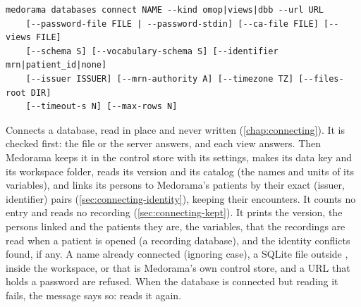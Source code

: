 \begin{lstlisting}[style=signature]
medorama databases connect NAME --kind omop|views|dbb --url URL
    [--password-file FILE | --password-stdin] [--ca-file FILE] [--views FILE]
    [--schema S] [--vocabulary-schema S] [--identifier mrn|patient_id|none]
    [--issuer ISSUER] [--mrn-authority A] [--timezone TZ] [--files-root DIR]
    [--timeout-s N] [--max-rows N]
\end{lstlisting}
Connects a database, read in place and never written (\cref{chap:connecting}). It is checked
first: the file or the server answers, and each view answers. Then Medorama keeps it in the
control store with its settings, makes its data key and its workspace folder, reads its version
and its catalog (the names and units of its variables), and links its persons to Medorama's
patients by their exact (issuer, identifier) pairs (\cref{sec:connecting-identity}), keeping
their encounters. It counts no entry and reads no recording (\cref{sec:connecting-kept}). It
prints the version, the persons linked and the patients they are, the variables, that the
recordings are read when a patient is opened (a recording database), and the identity conflicts
found, if any. A name already connected (ignoring case), a SQLite file outside
, inside the workspace, or that is Medorama's own control store, and a URL
that holds a password are refused. When the database is connected but reading it fails, the
message says so:  reads it again.
